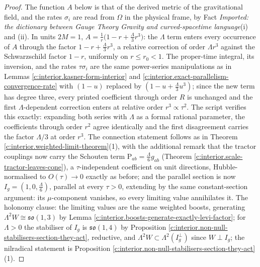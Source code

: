 \documentclass[11pt]{article}
\theoremstyle{definition}
\theoremstyle{plain}
\providecommand{\Sch}{}\renewcommand{\Sch}{\mathrm{P}}
\begin{document}
\begin{proof}
The function $A$ below is that of the derived metric of the gravitational field, and the rates $\sigma_i$ are read from $\Omega$ in the physical frame, by Fact \emph{Imported: the dictionary between Gauge Theory Gravity and curved-spacetime language}(i) and (ii). In units $2M = 1$, $A = \tfrac{1}{r}\bigl(1 - r + \tfrac{\Lambda}{3}r^3\bigr)$: the $\Lambda$ term enters every occurrence of $A$ through the factor $1 - r + \tfrac{\Lambda}{3}r^3$, a relative correction of order $\Lambda r^3$ against the Schwarzschild factor $1 - r$, uniformly on $r \le r_0 < 1$. The proper-time integral, its inversion, and the rates $\tau\sigma_i$ are the same power-series manipulations as in Lemmas \ref{c:interior.kasner-form-interior} and \ref{c:interior.exact-parallelism-convergence-rate} with $(1-u)$ replaced by $(1 - u + \tfrac{\Lambda}{3}u^3)$; since the new term has degree three, every printed coefficient through order $R$ is unchanged and the first $\Lambda$-dependent correction enters at relative order $r^3 \propto \tau^2$. The script verifies this exactly: expanding both series with $\Lambda$ as a formal rational parameter, the coefficients through order $r^{2}$ agree identically and the first disagreement carries the factor $\Lambda/3$ at order $r^3$. The connection statement follows as in Theorem \ref{c:interior.weighted-limit-theorem}(1), with the additional remark that the tractor couplings now carry the Schouten term $\Sch_{ab} = \tfrac{\Lambda}{6}g_{ab}$ (Theorem \ref{c:interior.scale-tractor-leaves-cone}), a $\tau$-independent coefficient on unit directions, Hubble-normalised to $O(\tau) \to 0$ exactly as before; and the parallel section is now $I_g = (1, 0, \tfrac{\Lambda}{6})$, parallel at every $\tau > 0$, extending by the same constant-section argument: its $\mu$-component vanishes, so every limiting value annihilates it. The holonomy clause: the limiting values are the same weighted boosts, generating $\Lambda^2 W \cong \mathfrak{so}(1,3)$ by Lemma \ref{c:interior.boosts-generate-exactly-levi-factor}; for $\Lambda > 0$ the stabiliser of $I_g$ is $\mathfrak{so}(1,4)$ by Proposition \ref{c:interior.non-null-stabilisers-section-they-act}, reductive, and $\Lambda^2 W \subset \Lambda^2(I_g^\perp)$ since $W \perp I_g$; the nilradical statement is Proposition \ref{c:interior.non-null-stabilisers-section-they-act}(1).

\end{proof}
\end{document}
